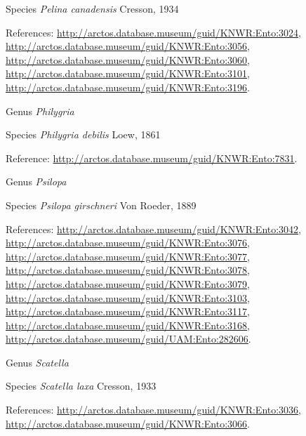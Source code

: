 \documentclass[9pt, article]{memoir}
\begin{document}
\begin{multicols}{2}
\vspace{6pt}\noindent\hspace{36pt}Species \textit{Pelina canadensis} Cresson, 1934


\vspace{6pt}References: 
\url{http://arctos.database.museum/guid/KNWR:Ento:3024}, 
\url{http://arctos.database.museum/guid/KNWR:Ento:3056}, 
\url{http://arctos.database.museum/guid/KNWR:Ento:3060}, 
\url{http://arctos.database.museum/guid/KNWR:Ento:3101}, 
\url{http://arctos.database.museum/guid/KNWR:Ento:3196}.

\vspace{6pt}\noindent\hspace{30pt}Genus \textit{Philygria}


\vspace{6pt}\noindent\hspace{36pt}Species \textit{Philygria debilis} Loew, 1861


\vspace{6pt}Reference: 
\url{http://arctos.database.museum/guid/KNWR:Ento:7831}.

\vspace{6pt}\noindent\hspace{30pt}Genus \textit{Psilopa}


\vspace{6pt}\noindent\hspace{36pt}Species \textit{Psilopa girschneri} Von Roeder, 1889


\vspace{6pt}References: 
\url{http://arctos.database.museum/guid/KNWR:Ento:3042}, 
\url{http://arctos.database.museum/guid/KNWR:Ento:3076}, 
\url{http://arctos.database.museum/guid/KNWR:Ento:3077}, 
\url{http://arctos.database.museum/guid/KNWR:Ento:3078}, 
\url{http://arctos.database.museum/guid/KNWR:Ento:3079}, 
\url{http://arctos.database.museum/guid/KNWR:Ento:3103}, 
\url{http://arctos.database.museum/guid/KNWR:Ento:3117}, 
\url{http://arctos.database.museum/guid/KNWR:Ento:3168}, 
\url{http://arctos.database.museum/guid/UAM:Ento:282606}.

\vspace{6pt}\noindent\hspace{30pt}Genus \textit{Scatella}


\vspace{6pt}\noindent\hspace{36pt}Species \textit{Scatella laxa} Cresson, 1933


\vspace{6pt}References: 
\url{http://arctos.database.museum/guid/KNWR:Ento:3036}, 
\url{http://arctos.database.museum/guid/KNWR:Ento:3066}.


\end{multicols}
\end{document}

